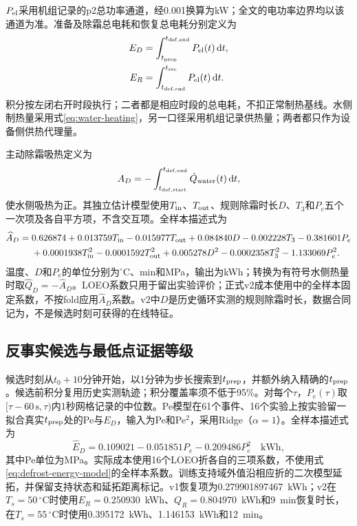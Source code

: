 \documentclass[UTF8,11pt,a4paper]{ctexart}
\begin{document}
$P_{\rm el}$采用机组记录的p2总功率通道，经0.001换算为kW；全文的电功率边界均以该通道为准。准备及除霜总电耗和恢复总电耗分别定义为
\begin{align}
E_D&=\int_{t_{\rm prep}}^{t_{\rm def,end}}P_{\rm el}(t)\,{\rm d}t,\\
E_R&=\int_{t_{\rm def,end}}^{t_{\rm rec}}P_{\rm el}(t)\,{\rm d}t.
\end{align}
积分按左闭右开时段执行；二者都是相应时段的总电耗，不扣正常制热基线。水侧制热量采用式\eqref{eq:water-heating}，另一口径采用机组记录供热量；两者都只作为设备侧供热代理量。

主动除霜吸热定义为
\begin{equation}
A_D=-\int_{t_{\rm def,start}}^{t_{\rm def,end}}\dot Q_{\rm water}(t)\,{\rm d}t,
\end{equation}
使水侧吸热为正。其独立估计模型使用$T_{\rm in}$、$T_{\rm out}$、规则除霜时长$D$、$T_3$和$P_e$五个一次项及各自平方项，不含交互项。全样本描述式为
\begin{align}
\widehat A_D={}&0.626874+0.013759T_{\rm in}-0.015977T_{\rm out}+0.084840D
-0.002228T_3-0.381601P_e\nonumber\\
&+0.0001938T_{\rm in}^2-0.0001592T_{\rm out}^2+0.005278D^2
-0.0002358T_3^2-1.133069P_e^2.
\label{eq:absorbed-heat-model}
\end{align}
温度、$D$和$P_e$的单位分别为$^\circ$C、min和MPa，输出为kWh；转换为有符号水侧热量时取$\widehat Q_D=-\widehat A_D$。LOEO系数只用于留出实验评价；正式v2成本使用中的全样本固定系数，不按fold应用$\widehat A_D$系数。v2中$D$是历史循环实测的规则除霜时长，数据合同记为，不是候选时刻可获得的在线特征。

\subsection{反事实候选与最低点证据等级}
候选时刻从$t_0+10$分钟开始，以1分钟为步长搜索到$t_{\rm prep}$，并额外纳入精确的$t_{\rm prep}$。候选前积分复用历史实测轨迹；积分覆盖率须不低于95\%。对每个$\tau$，$P_e(\tau)$取$[\tau-60\,\mathrm{s},\tau)$内1秒网格记录的中位数。Pe模型在61个事件、16个实验上按实验留一拟合真实$t_{\rm prep}$处的Pe与$E_D$，输入为Pe和Pe$^2$，采用Ridge（$\alpha=1$）。全样本描述式为
\begin{equation}
\widehat E_D=0.109021-0.051851P_e-0.209486P_e^2\quad\mathrm{kWh},
\label{eq:defrost-energy-model}
\end{equation}
其中Pe单位为MPa。实际成本使用16个LOEO折各自的三项系数，不使用式\eqref{eq:defrost-energy-model}的全样本系数。训练支持域外值沿相应折的二次模型延拓，并保留支持状态和延拓距离标记。v1恢复项为0.279901897467~kWh；v2在$T_s=50$\,$^\circ$C时使用$E_R=0.250930$~kWh、$Q_R=0.804970$~kWh和9~min恢复时长，在$T_s=55$\,$^\circ$C时使用0.395172~kWh、1.146153~kWh和12~min。
\end{document}
